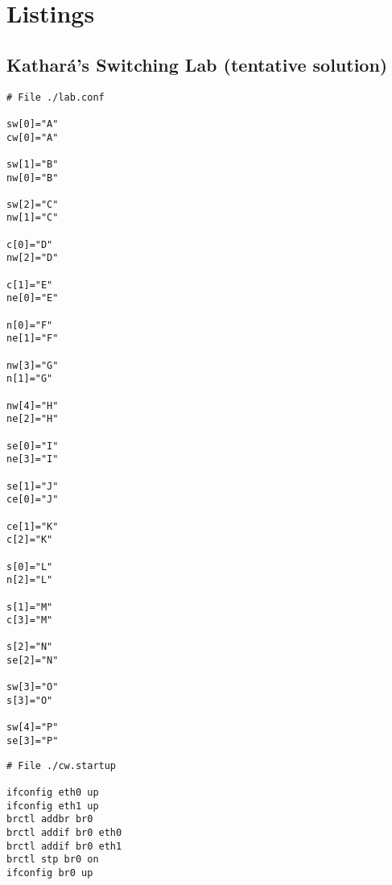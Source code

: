 \chapter{Listings}
\label{ch:listings}

\section{Kathará's Switching Lab (tentative solution)}

\begin{lstlisting}[frame=single,caption=Lab 2's topology configuration,captionpos=b,label=listlab2conf]
# File ./lab.conf

sw[0]="A"
cw[0]="A"

sw[1]="B"
nw[0]="B"

sw[2]="C"
nw[1]="C"

c[0]="D"
nw[2]="D"

c[1]="E"
ne[0]="E"

n[0]="F"
ne[1]="F"

nw[3]="G"
n[1]="G"

nw[4]="H"
ne[2]="H"

se[0]="I"
ne[3]="I"

se[1]="J"
ce[0]="J"

ce[1]="K"
c[2]="K"

s[0]="L"
n[2]="L"

s[1]="M"
c[3]="M"

s[2]="N"
se[2]="N"

sw[3]="O"
s[3]="O"

sw[4]="P"
se[3]="P"
\end{lstlisting}

\begin{lstlisting}[frame=single,caption=Example node startup configuration,captionpos=b,label=listlab2startup]
# File ./cw.startup

ifconfig eth0 up
ifconfig eth1 up
brctl addbr br0
brctl addif br0 eth0
brctl addif br0 eth1
brctl stp br0 on
ifconfig br0 up
\end{lstlisting}

